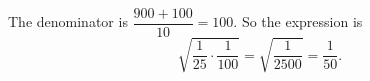 The denominator is $\dfrac{900+100}{10}=100$. So the expression is
\[
\sqrt{\dfrac{1}{25}\cdot\dfrac{1}{100}}=\sqrt{\dfrac{1}{2500}}=\boxed{\dfrac{1}{50}}.
\]
